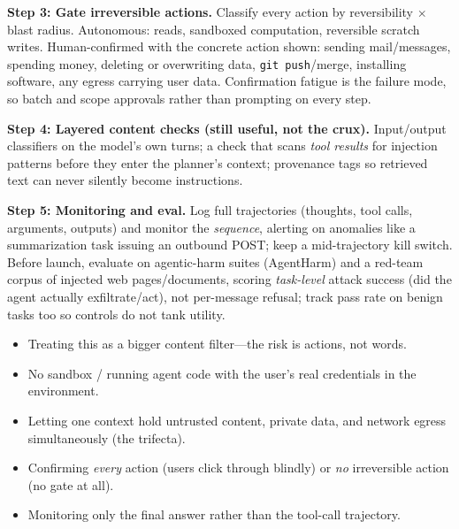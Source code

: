 \begin{interviewq}
\textbf{Step 3: Gate irreversible actions.} Classify every action by reversibility $\times$ blast radius. Autonomous: reads, sandboxed computation, reversible scratch writes. Human-confirmed with the concrete action shown: sending mail/messages, spending money, deleting or overwriting data, \texttt{git push}/merge, installing software, any egress carrying user data. Confirmation fatigue is the failure mode, so batch and scope approvals rather than prompting on every step.

\textbf{Step 4: Layered content checks (still useful, not the crux).} Input/output classifiers on the model's own turns; a check that scans \textit{tool results} for injection patterns before they enter the planner's context; provenance tags so retrieved text can never silently become instructions.

\textbf{Step 5: Monitoring and eval.} Log full trajectories (thoughts, tool calls, arguments, outputs) and monitor the \textit{sequence}, alerting on anomalies like a summarization task issuing an outbound POST; keep a mid-trajectory kill switch. Before launch, evaluate on agentic-harm suites (AgentHarm) and a red-team corpus of injected web pages/documents, scoring \textit{task-level} attack success (did the agent actually exfiltrate/act), not per-message refusal; track pass rate on benign tasks too so controls do not tank utility.

\redflags
\begin{itemize}
    \item Treating this as a bigger content filter---the risk is actions, not words.
    \item No sandbox / running agent code with the user's real credentials in the environment.
    \item Letting one context hold untrusted content, private data, and network egress simultaneously (the trifecta).
    \item Confirming \textit{every} action (users click through blindly) or \textit{no} irreversible action (no gate at all).
    \item Monitoring only the final answer rather than the tool-call trajectory.
\end{itemize}



\end{interviewq}
